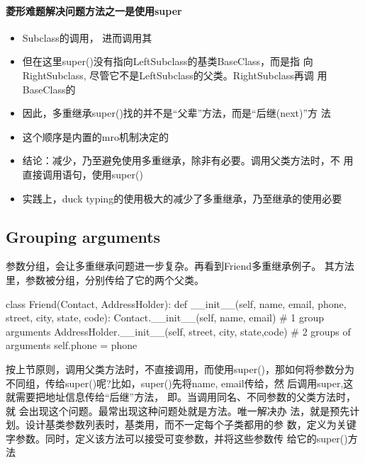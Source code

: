 \paragraph{菱形难题解决问题方法之一是使用super}
\begin{itemize}
\item
  Subclass的调用，
  进而调用其
\item 但在这里super()没有指向LeftSubclass的基类BaseClass，而是指
  向RightSubclass, 尽管它不是LeftSubclass的父类。RightSubclass再调
  用BaseClass的
\item 因此，多重继承super()找的并不是“父辈”方法，而是“后继(next)”方
  法
\item 这个顺序是内置的mro机制决定的
\item 结论：减少，乃至避免使用多重继承，除非有必要。调用父类方法时，不
  用直接调用语句，使用super()
\item 实践上，duck typing的使用极大的减少了多重继承，乃至继承的使用必要
\end{itemize}

\subsection{Grouping arguments}
参数分组，会让多重继承问题进一步复杂。再看到Friend多重继承例子。
其方法里，参数被分组，分别传给了它的两个父类。

\begin{python}
class Friend(Contact, AddressHolder):
    def __init__(self,
                name,
                email,
                phone,
                street,
                city,
                state,
                code):
        Contact.__init__(self, name, email)  # 1 group arguments
        AddressHolder.__init__(self, street, city, state,code)  # 2 groups of arguments
        self.phone = phone
\end{python}

按上节原则，调用父类方法时，不直接调用，而使用super()，那如何将参数分为
不同组，传给super()呢?比如，super()先将name,
email传给，然
后调用super,这就需要把地址信息传给“后继”方法，
即。当调用同名、不同参数的父类方法时，就
会出现这个问题。最常出现这种问题处就是方法。唯一解决办
法，就是预先计划。设计基类参数列表时，基类用，而不一定每个子类都用的参
数，定义为关键字参数。同时，定义该方法可以接受可变参数，并将这些参数传
给它的super()方法
  
